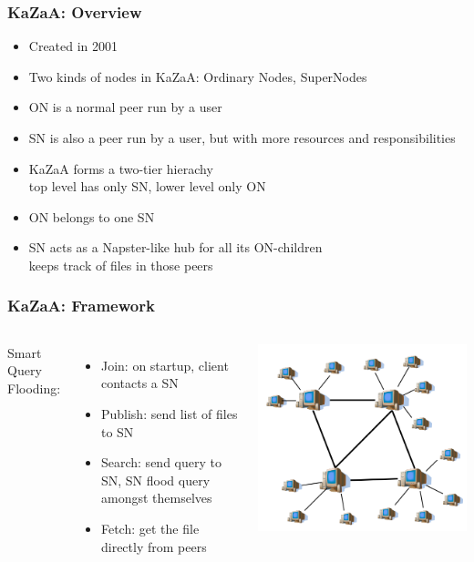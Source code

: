 \begin{frame}
    \frametitle{KaZaA: Overview}
    \begin{itemize}
        \item Created in 2001
        \item Two kinds of nodes in KaZaA: \alert{Ordinary Nodes}, \alert{SuperNodes}
        \item ON is a normal peer run by a user
        \item SN is also a peer run by a user, but with more resources and responsibilities
        \item KaZaA forms a two-tier hierachy \\
            top level has only SN, lower level only ON
        \item ON belongs to one SN
        \item SN acts as a Napster-like hub for all its ON-children \\
            keeps track of files in those peers
    \end{itemize}
\end{frame}

\begin{frame}
    \frametitle{KaZaA: Framework}
    \begin{columns}
        Smart Query Flooding:
        \begin{itemize}
            \item Join: on startup, client contacts a SN
            \item Publish: send list of files to SN
            \item Search: send query to SN, SN flood query amongst themselves
            \item Fetch: get the file directly from peers
        \end{itemize}
            \includegraphics[scale=0.3]{figures/kazaa.png}
    \end{columns}
\end{frame}

